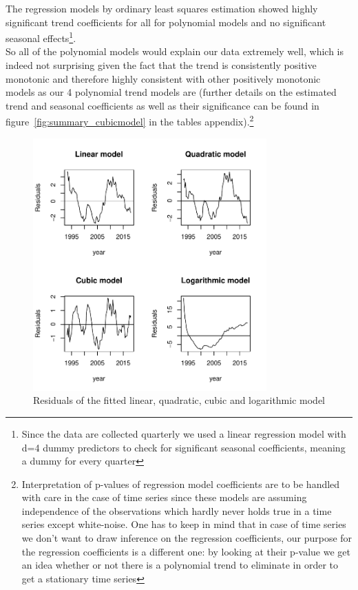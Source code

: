 \documentclass[11pt,a4paper]{article}
\begin{document}
The regression models by ordinary least squares estimation \cite[p.~11]{htf09} showed highly significant trend coefficients for all for polynomial models and no significant seasonal effects\footnote{Since the data are collected quarterly we used a linear regression model with d=4 dummy predictors to check for significant seasonal coefficients, meaning a dummy for every quarter}. \\
So all of the polynomial models would explain our data extremely well, which is indeed not surprising given the fact that the trend is consistently positive monotonic and therefore highly consistent with other positively monotonic models as our 4 polynomial trend models are (further details on the estimated trend and seasonal coefficients as well as their significance can be found in figure~\ref{fig:summary_cubicmodel} in the tables appendix).\footnote{Interpretation of p-values of regression model coefficients are to be handled with care in the case of time series since these models are assuming independence of the observations which hardly never holds true in a time series except white-noise. One has to keep in mind that in case of time series we don't want to draw inference on the regression coefficients, our purpose for the regression coefficients is a different one: by looking at their p-value we get an idea whether or not there is a polynomial trend to eliminate in order to get a stationary time series} \\
\begin{figure}[!ht]
\centering
\includegraphics[angle=0,
width=0.8\textwidth]{resid_polynomials}
\caption{Residuals of the fitted linear, quadratic, cubic and logarithmic model
\label{fig:resid_polynomials}}
\end{figure}
\end{document}
